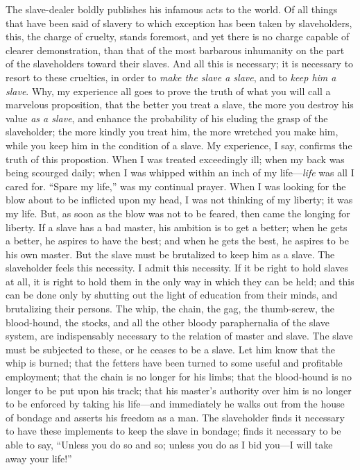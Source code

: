 The slave-dealer boldly publishes his infamous acts to the world. Of all
things that have been said of slavery to which exception has been taken
by slaveholders, this, the charge of cruelty, stands foremost, and yet
there is no charge capable of clearer demonstration, than that of the
most barbarous inhumanity on the part of the {}slaveholders toward their
slaves. And all this is necessary; it is necessary to resort to these
cruelties, in order to \emph{make the slave a slave}, and to \emph{keep
him a slave}. Why, my experience all goes to prove the truth of what you
will call a marvelous proposition, that the better you treat a slave,
the more you destroy his value \emph{as a slave}, and enhance the
probability of his eluding the grasp of the slaveholder; the more kindly
you treat him, the more wretched you make him, while you keep him in the
condition of a slave. My experience, I say, confirms the truth of this
propostion. When I was treated exceedingly ill; when my back was being
scourged daily; when I was whipped within an inch of my
life---\emph{life} was all I cared for. ``Spare my life,'' was my
continual prayer. When I was looking for the blow about to be inflicted
upon my head, I was not thinking of my liberty; it was my life. But, as
soon as the blow was not to be feared, then came the longing for
liberty. If a slave has a bad master, his ambition is to get a better;
when he gets a better, he aspires to have the best; and when he gets the
best, he aspires to be his own master. But the slave must be brutalized
to keep him as a slave. The slaveholder feels this necessity. I admit
this necessity. If it be right to hold slaves at all, it is right to
hold them in the only way in which they can be held; and this can be
done only by shutting out the light of education from their minds, and
brutalizing their persons. The whip, the chain, the gag, the
thumb-screw, the blood-hound, the stocks, and all the other bloody
paraphernalia of the slave system, are indispensably necessary to the
relation of master and slave. The slave must be subjected to these, or
he ceases to be a slave. Let him know that the whip is burned; that the
fetters have been turned to some useful and profitable employment; that
the chain is no longer for his limbs; that the blood-hound is no longer
to be put upon his track; that his master's authority over him is no
longer to be enforced by taking his life---and immediately he walks out
from the house of bondage and asserts his freedom as a man. The
slaveholder finds it necessary to have these implements to keep the
slave in bondage; finds it necessary to be able to say, ``Unless you do
so and so; unless you do as I bid you---I will take away your life!''

